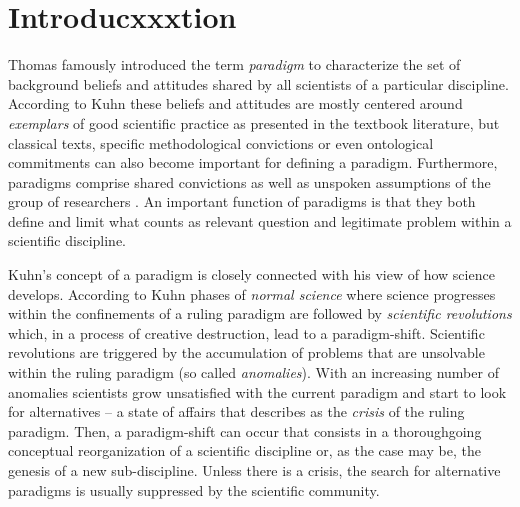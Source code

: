 \documentclass[12pt, a4paper]{article}
\begin{document}
\newpage

\tableofcontents

\onehalfspacing

\section{Introducxxxtion}

Thomas \citet{kuhn:1976} famously introduced the term {\em paradigm}
to characterize the set of background beliefs and attitudes shared by
all scientists of a particular discipline. According to Kuhn these
beliefs and attitudes are mostly centered around {\em exemplars} of
good scientific practice as presented in the textbook literature, but
classical texts, specific methodological convictions or even
ontological commitments can also become important for defining a
paradigm. Furthermore, paradigms comprise shared convictions as well
as unspoken assumptions of the group of researchers
\citep[postscript]{kuhn:1976}. An important function of paradigms is
that they both define and limit what counts as relevant question and
legitimate problem within a scientific discipline.

Kuhn's concept of a paradigm is closely connected with his view of how
science develops. According to Kuhn phases of {\em normal science}
where science progresses within the confinements of a ruling paradigm
are followed by {\em scientific revolutions} which, in a process of
creative destruction, lead to a paradigm-shift. Scientific revolutions
are triggered by the accumulation of problems that are unsolvable
within the ruling paradigm (so called {\em anomalies}).  With an
increasing number of anomalies scientists grow unsatisfied with the
current paradigm and start to look for alternatives -- a state of
affairs that \citet[ch. 7/8]{kuhn:1976} describes as the {\em crisis}
of the ruling paradigm. Then, a paradigm-shift can occur that consists
in a thoroughgoing conceptual reorganization of a scientific
discipline or, as the case may be, the genesis of a new
sub-discipline. Unless there is a crisis, the search for alternative
paradigms is usually suppressed by the scientific community.
\end{document}

